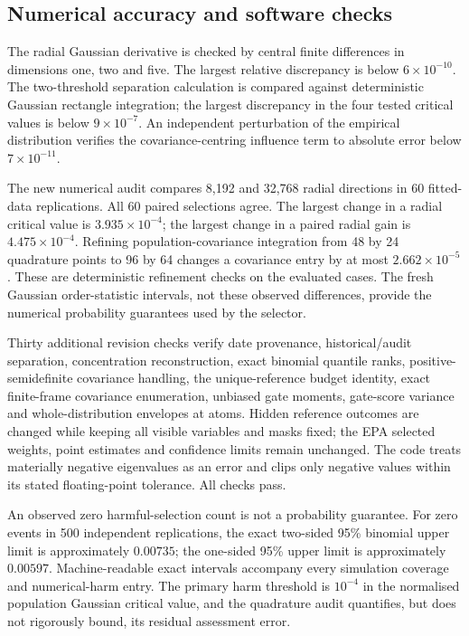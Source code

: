 \subsection{Numerical accuracy and software checks}
The radial Gaussian derivative is checked by central finite differences in dimensions one, two and five. The largest relative discrepancy is below $6\times10^{-10}$. The two-threshold separation calculation is compared against deterministic Gaussian rectangle integration; the largest discrepancy in the four tested critical values is below $9\times10^{-7}$. An independent perturbation of the empirical distribution verifies the covariance-centring influence term to absolute error below $7\times10^{-11}$.

The new numerical audit compares 8,192 and 32,768 radial directions in 60 fitted-data replications. All 60 paired selections agree. The largest change in a radial critical value is $3.935\times10^{-4}$; the largest change in a paired radial gain is $4.475\times10^{-4}$. Refining population-covariance integration from 48 by 24 quadrature points to 96 by 64 changes a covariance entry by at most $2.662\times10^{-5}$. These are deterministic refinement checks on the evaluated cases. The fresh Gaussian order-statistic intervals, not these observed differences, provide the numerical probability guarantees used by the selector.

Thirty additional revision checks verify date provenance, historical/audit separation, concentration reconstruction, exact binomial quantile ranks, positive-semidefinite covariance handling, the unique-reference budget identity, exact finite-frame covariance enumeration, unbiased gate moments, gate-score variance and whole-distribution envelopes at atoms. Hidden reference outcomes are changed while keeping all visible variables and masks fixed; the EPA selected weights, point estimates and confidence limits remain unchanged. The code treats materially negative eigenvalues as an error and clips only negative values within its stated floating-point tolerance. All checks pass.

An observed zero harmful-selection count is not a probability guarantee. For zero events in 500 independent replications, the exact two-sided 95\% binomial upper limit is approximately $0.00735$; the one-sided 95\% upper limit is approximately $0.00597$. Machine-readable exact intervals accompany every simulation coverage and numerical-harm entry. The primary harm threshold is $10^{-4}$ in the normalised population Gaussian critical value, and the quadrature audit quantifies, but does not rigorously bound, its residual assessment error.

